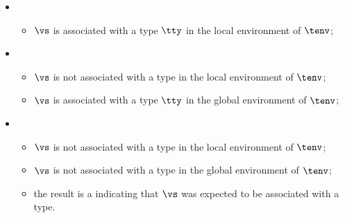 \ProseParagraph
\OneApplies
\begin{itemize}
  \item {}
  \begin{itemize}
    \item $\vs$ is associated with a type $\tty$ in the local environment of $\tenv$;
  \end{itemize}

  \item {}
  \begin{itemize}
    \item $\vs$ is not associated with a type in the local environment of $\tenv$;
    \item $\vs$ is associated with a type $\tty$ in the global environment of $\tenv$;
  \end{itemize}

  \item {}
  \begin{itemize}
    \item $\vs$ is not associated with a type in the local environment of $\tenv$;
    \item $\vs$ is not associated with a type in the global environment of $\tenv$;
    \item the result is a \typingerrorterm{} indicating that $\vs$ was expected to be associated
          with a type.
  \end{itemize}
\end{itemize}

\FormallyParagraph
{}


